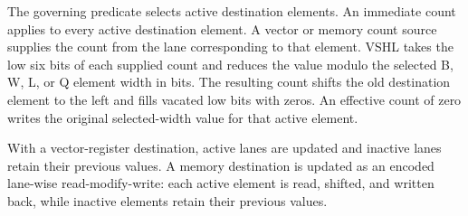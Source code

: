 The governing predicate selects active destination elements. An immediate
count applies to every active destination element. A vector or
memory count source supplies the count from the lane corresponding to that
element. VSHL takes the low six bits of each supplied count and reduces the
value modulo the selected B, W, L, or Q element width in bits. The resulting
count shifts the old destination element to the left and fills vacated low bits
with zeros. An effective count of zero writes the original selected-width value
for that active element.

With a vector-register destination, active lanes are updated and inactive lanes
retain their previous values. A memory destination is updated as an encoded
lane-wise read-modify-write: each active element is read, shifted, and written
back, while inactive elements retain their previous values.
